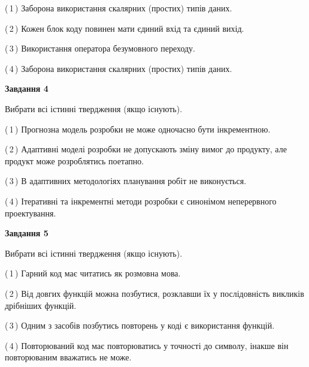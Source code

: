 \documentclass[10pt, ukrainian]{article}
\begin{document}
{\begin {large}
(\,1\,) Заборона використання скалярних (простих) типів даних. %



(\,2\,) Кожен блок коду повинен мати єдиний вхід та єдиний вихід.%



(\,3\,) Використання оператора безумовного переходу. %



(\,4\,) Заборона використання скалярних (простих) типів даних. %


{\begin {center}\textbf{Завдання 4}\end {center}}\par
Вибрати всі істинні твердження (якщо існують).\par
\vspace{2mm}



(\,1\,) Прогнозна модель розробки не може одночасно бути інкрементною. %



(\,2\,) Адаптивні моделі розробки не допускають зміну вимог до продукту, але продукт може розроблятись поетапно. %



(\,3\,) В адаптивних методологіях планування робіт не виконується. %



(\,4\,) Ітеративні та інкрементні методи розробки є синонімом неперервного проектування. %


{\begin {center}\textbf{Завдання 5}\end {center}}\par
Вибрати всі істинні твердження (якщо існують).\par
\vspace{2mm}



(\,1\,) Гарний код має читатись як розмовна мова. %



(\,2\,) Від довгих функцій можна позбутися, розклавши їх у послідовність викликів дрібніших функцій. %



(\,3\,) Одним з засобів позбутись повторень у коді є використання функцій. %



(\,4\,) Повторюваний код має повторюватись у точності до символу, інакше він повторюваним вважатись не може. %


\end{large}}
\end{document}
